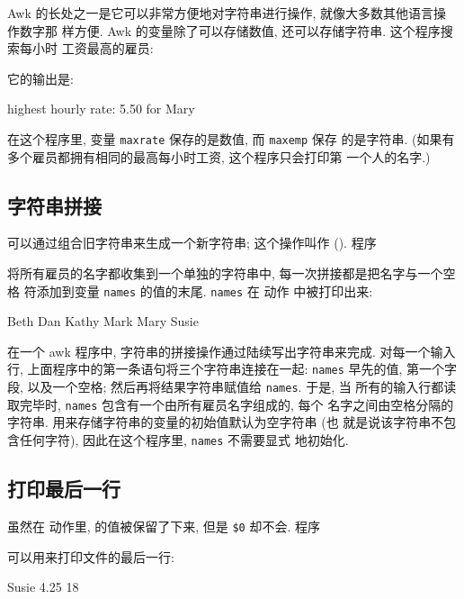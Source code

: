 Awk 的长处之一是它可以非常方便地对字符串进行操作, 就像大多数其他语言操
作数字那
样方便. Awk 的变量除了可以存储数值, 还可以存储字符串. 这个程序搜索每小时
工资最高的雇员:
它的输出是:
\begin{file}
    highest hourly rate: 5.50 for Mary
\end{file}
在这个程序里, 变量 \texttt{maxrate} 保存的是数值, 而 \texttt{maxemp} 保存
的是字符串. (如果有多个雇员都拥有相同的最高每小时工资, 这个程序只会打印第
一个人的名字.)

\subsection{字符串拼接}
\label{subsec:string_concatenation}

可以通过组合旧字符串来生成一个新字符串; 这个操作叫作
(). 程序
将所有雇员的名字都收集到一个单独的字符串中, 每一次拼接都是把名字与一个空格
符添加到变量 \texttt{names} 的值的末尾. \texttt{names} 在 \END 动作
中被打印出来:
\begin{file}
    Beth Dan Kathy Mark Mary Susie 
\end{file}
在一个 awk 程序中, 字符串的拼接操作通过陆续写出字符串来完成. 对每一个输入行,
上面程序中的第一条语句将三个字符串连接在一起: \texttt{names} 早先的值,
第一个字段, 以及一个空格; 然后再将结果字符串赋值给 \texttt{names}. 于是, 当
所有的输入行都读取完毕时, \texttt{names} 包含有一个由所有雇员名字组成的,
每个
名字之间由空格分隔的字符串. 用来存储字符串的变量的初始值默认为空字符串 (也
就是说该字符串不包含任何字符), 因此在这个程序里, \texttt{names} 不需要显式
地初始化.

\subsection{打印最后一行}
\label{subsec:printing_the_last_input_line}

虽然在 \END 动作里, \nr 的值被保留了下来, 但是 \verb'$0' 却不会. 程序
可以用来打印文件的最后一行:
\begin{file}
    Susie   4.25    18
\end{file}

